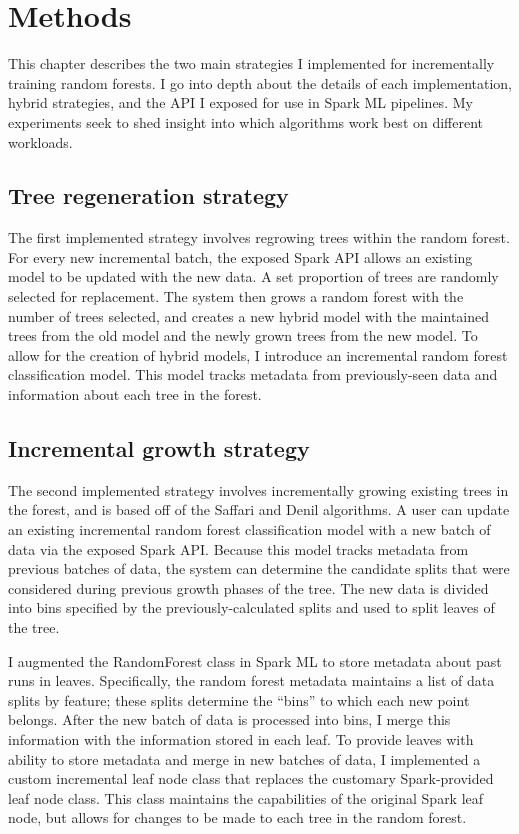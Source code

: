 \chapter{Methods} This chapter describes the two main strategies I implemented
for incrementally training random forests. I go into depth about the details of
each implementation, hybrid strategies, and the API I exposed for use in Spark
ML pipelines. My experiments seek to shed insight into which algorithms work
best on different workloads.

\section{Tree regeneration strategy}

The first implemented strategy involves regrowing trees within the random
forest. For every new incremental batch, the exposed Spark API allows an
existing model to be updated with the new data. A set proportion of trees are
randomly selected for replacement. The system then grows a random forest with
the number of trees selected, and creates a new hybrid model with the
maintained trees from the old model and the newly grown trees from the new
model. To allow for the creation of hybrid models, I introduce an incremental
random forest classification model. This model tracks metadata from
previously-seen data and information about each tree in the forest. 

\section{Incremental growth strategy}

The second implemented strategy involves incrementally growing existing trees
in the forest, and is based off of the Saffari and Denil algorithms. A user can
update an existing incremental random forest classification model with a new
batch of data via the exposed Spark API. Because this model tracks metadata
from previous batches of data, the system can determine the candidate splits
that were considered during previous growth phases of the tree. The new data is
divided into bins specified by the previously-calculated splits and used to
split leaves of the tree.

I augmented the RandomForest class in Spark ML to store metadata about past
runs in leaves. Specifically, the random forest metadata maintains a list of
data splits by feature; these splits determine the ``bins'' to which each new
point belongs. After the new batch of data is processed into bins, I merge this
information with the information stored in each leaf. To provide leaves with
ability to store metadata and merge in new batches of data, I implemented a
custom incremental leaf node class that replaces the customary Spark-provided
leaf node class. This class maintains the capabilities of the original Spark
leaf node, but allows for changes to be made to each tree in the random forest.


